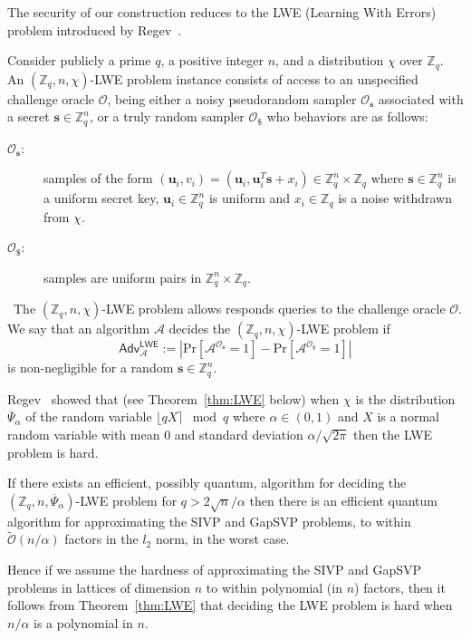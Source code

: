 \documentclass[runningheads,10pt]{llncs}
\def\ZZ{\mathbb{Z}}
\def\cal{\mathcal}
\def\bf{\mathbf}
\def\Pr{\mathrm{Pr}}
\def\Adv{\mathsf{Adv}}
\def\u{\bf{u}}
\def\s{\bf{s}}
\begin{document}
The security of our construction reduces to the LWE (Learning With Errors) problem introduced by Regev~\cite{Regev05}.
\begin{definition}
	Consider publicly a prime $q$, a positive integer $n$, and a distribution $\chi$ over $\ZZ_q$. An $(\ZZ_q,n,\chi)$-LWE problem instance consists of access to an unspecified challenge oracle $\cal{O}$, being either a noisy pseudorandom sampler $\cal{O}_\s$ associated with a secret $\s\in\ZZ_q^n$, or a truly random sampler $\cal{O}_\$$ who behaviors are as follows:
	\begin{description}
		\item[$\cal{O}_\s$:] samples of the form $(\u_i,v_i)=(\u_i,\u_i^T\s+x_i)\in\ZZ_q^n\times\ZZ_q$ where $\s\in\ZZ_q^n$ is a uniform secret key, $\u_i\in\ZZ_q^n$ is uniform and $x_i\in\ZZ_q$ is a noise withdrawn from $\chi$.
		\item[$\cal{O}_\$$:] samples are uniform pairs in $\ZZ_q^n\times\ZZ_q$.
	\end{description}\
	The $(\ZZ_q,n,\chi)$-LWE problem allows responds queries to the challenge oracle $\cal{O}$. We say that an algorithm $\cal{A}$ decides the $(\ZZ_q,n,\chi)$-LWE problem if 
	$$\Adv_{\cal{A}}^{\mathsf{LWE}}:=\left|\Pr[\cal{A}^{\cal{O}_\s}=1] - \Pr[\cal{A}^{\cal{O}_\$}=1] \right|$$    
	is non-negligible for a random $\s\in\ZZ_q^n$.
\end{definition}
Regev~\cite{Regev05} showed that (see Theorem~\ref{thm:LWE} below) when $\chi$ is the distribution $\overline{\Psi}_\alpha$ of the random variable $\lfloor qX\rceil\mod q$ where $\alpha\in(0,1)$ and $X$ is a normal random variable with mean $0$ and standard deviation $\alpha/\sqrt{2\pi}$ then the LWE problem is hard. 
\begin{theorem}\label{thm:LWE}%
	If there exists an efficient, possibly quantum, algorithm for deciding the $(\ZZ_q,n,\overline{\Psi}_\alpha)$-LWE problem for $q>2\sqrt{n}/\alpha$ then there is an efficient quantum algorithm for approximating the SIVP and GapSVP problems, to within $\tilde{\cal{O}}(n/\alpha)$ factors in the $l_2$ norm, in the worst case.
\end{theorem}
Hence if we assume  the hardness of approximating the SIVP and GapSVP problems in lattices of dimension $n$ to within polynomial (in $n$) factors, then it follows from Theorem~\ref{thm:LWE} that deciding the LWE problem is hard when $n/\alpha$ is a polynomial in $n$.

\end{document}
